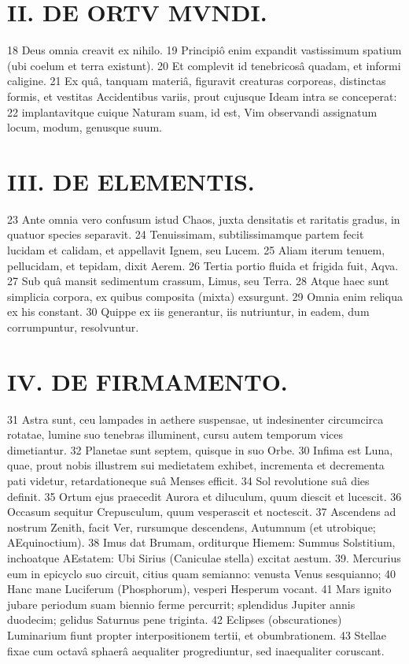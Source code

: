 \newpage

\section*{II. DE ORTV MVNDI.}
18 Deus omnia creavit ex nihilo. 19 Principiô enim expandit vastissimum spatium (ubi coelum et terra existunt). 20 Et complevit id tenebricosâ quadam, et informi caligine. 21 Ex quâ, tanquam materiâ, figuravit creaturas corporeas, distinctas formis, et vestitas Accidentibus variis, prout cujusque Ideam intra se conceperat: 22 implantavitque cuique Naturam suam, id est, Vim observandi assignatum locum, modum, genusque suum.

\section*{III. DE ELEMENTIS.}
23 Ante omnia vero confusum istud Chaos, juxta densitatis et raritatis gradus, in quatuor species separavit. 24 Tenuissimam, subtilissimamque partem fecit lucidam et calidam, et appellavit Ignem, seu Lucem. 25 Aliam iterum tenuem, pellucidam, et tepidam, dixit Aerem. 26 Tertia portio fluida et frigida fuit, Aqva. 27 Sub quâ mansit sedimentum crassum, Limus, seu Terra. 28 Atque haec sunt simplicia corpora, ex quibus composita (mixta) exsurgunt. 29 Omnia enim reliqua ex his constant. 30 Quippe ex iis generantur, iis nutriuntur, in eadem, dum corrumpuntur, resolvuntur.

\section*{IV. DE FIRMAMENTO.}
31 Astra sunt, ceu lampades in aethere suspensae, ut indesinenter circumcirca rotatae, lumine suo tenebras illuminent, cursu autem temporum vices dimetiantur. 32 Planetae sunt septem, quisque in suo Orbe. 30 Infima est Luna, quae, prout nobis illustrem sui medietatem exhibet, incrementa et decrementa pati videtur, retardationeque suâ Menses efficit. 34 Sol revolutione suâ dies definit. 35 Ortum ejus praecedit Aurora et diluculum, quum diescit et lucescit. 36 Occasum sequitur Crepusculum, quum vesperascit et noctescit. 37 Ascendens ad nostrum Zenith, facit Ver, rursumque descendens, Autumnum (et utrobique; AEquinoctium). 38 Imus dat Brumam, orditurque Hiemem: Summus Solstitium, inchoatque AEstatem: Ubi Sirius (Caniculae stella) excitat aestum. 39. Mercurius eum in epicyclo suo circuit, citius quam semianno: venusta Venus sesquianno; 40 Hanc mane Luciferum (Phosphorum), vesperi Hesperum vocant. 41 Mars ignito jubare periodum suam biennio ferme percurrit; splendidus Jupiter annis duodecim; gelidus Saturnus pene triginta. 42 Eclipses (obscurationes) Luminarium fiunt propter interpositionem tertii, et obumbrationem. 43 Stellae fixae cum octavâ sphaerâ aequaliter progrediuntur, sed inaequaliter coruscant.


